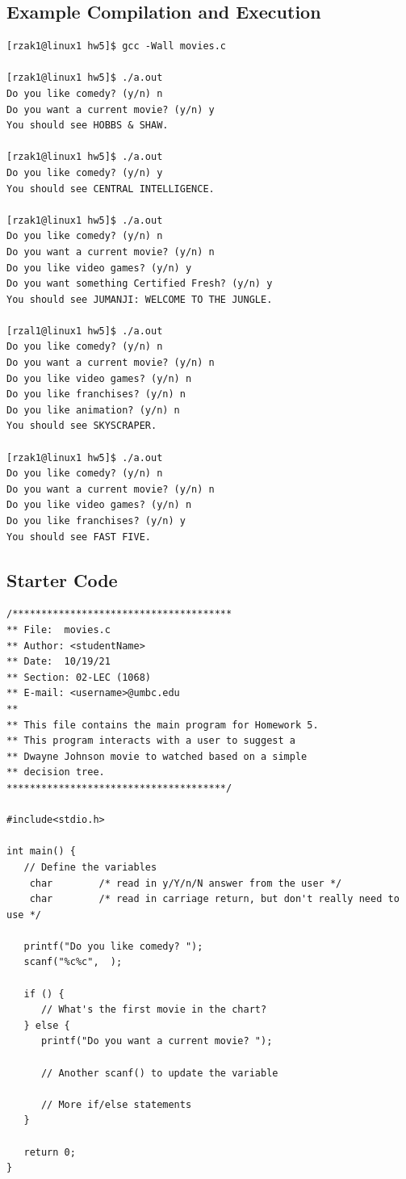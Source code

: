 \documentclass[letter,11pt]{article}
\begin{document}
\subsection*{Example Compilation and Execution}
\begin{verbatim}
[rzak1@linux1 hw5]$ gcc -Wall movies.c

[rzak1@linux1 hw5]$ ./a.out
Do you like comedy? (y/n) n
Do you want a current movie? (y/n) y
You should see HOBBS & SHAW.

[rzak1@linux1 hw5]$ ./a.out
Do you like comedy? (y/n) y
You should see CENTRAL INTELLIGENCE.

[rzak1@linux1 hw5]$ ./a.out
Do you like comedy? (y/n) n
Do you want a current movie? (y/n) n
Do you like video games? (y/n) y
Do you want something Certified Fresh? (y/n) y
You should see JUMANJI: WELCOME TO THE JUNGLE.

[rzal1@linux1 hw5]$ ./a.out
Do you like comedy? (y/n) n
Do you want a current movie? (y/n) n
Do you like video games? (y/n) n
Do you like franchises? (y/n) n
Do you like animation? (y/n) n
You should see SKYSCRAPER.

[rzak1@linux1 hw5]$ ./a.out
Do you like comedy? (y/n) n
Do you want a current movie? (y/n) n
Do you like video games? (y/n) n
Do you like franchises? (y/n) y
You should see FAST FIVE.
\end{verbatim}

\subsection*{Starter Code}
\begin{verbatim}
/**************************************
** File:  movies.c
** Author: <studentName>
** Date:  10/19/21
** Section: 02-LEC (1068)
** E-mail: <username>@umbc.edu
**
** This file contains the main program for Homework 5.
** This program interacts with a user to suggest a
** Dwayne Johnson movie to watched based on a simple
** decision tree.
**************************************/

#include<stdio.h>

int main() {
   // Define the variables
    char        /* read in y/Y/n/N answer from the user */
    char        /* read in carriage return, but don't really need to use */

   printf("Do you like comedy? ");
   scanf("%c%c",  );

   if () {
      // What's the first movie in the chart?
   } else {
      printf("Do you want a current movie? ");
      
      // Another scanf() to update the variable

      // More if/else statements
   }

   return 0;
}
\end{verbatim}
\end{document}
